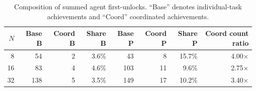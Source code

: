 \begin{table}[t]
\centering
\small
\setlength{\tabcolsep}{5pt}
\begin{tabular}{rrrrrrrr}
\toprule
$N$ & Base B & Coord B & Share B & Base P & Coord P & Share P & Coord count ratio \\
\midrule
8 & 54 & 2 & 3.6\% & 43 & 8 & 15.7\% & 4.00$\times$ \\
16 & 83 & 4 & 4.6\% & 103 & 11 & 9.6\% & 2.75$\times$ \\
32 & 138 & 5 & 3.5\% & 149 & 17 & 10.2\% & 3.40$\times$ \\
\bottomrule
\end{tabular}
\caption{Composition of summed agent first-unlocks. ``Base'' denotes individual-task achievements and ``Coord'' coordinated achievements.}
\label{tab:composition}
\end{table}
